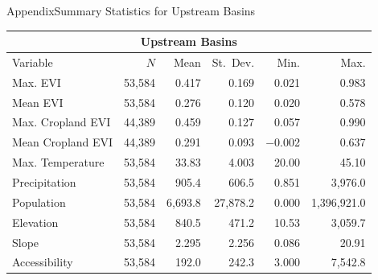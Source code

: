 \documentclass[aspectratio=169,11pt,dvipsnames, handout]{beamer}
\begin{document}

\begin{frame}{\textcolor{defaultclr!30}{Appendix}\hspace{0.75em}Summary Statistics for Upstream Basins}
\label{frame:covars_balance}
    \centering
\begin{tabular}{@{\extracolsep{5pt}}lrrrrr} 
\toprule \multicolumn{6}{c}{Upstream Basins} \\ \midrule
Variable & $N$ & Mean & St.~Dev. & Min. & Max. \\ \midrule
Max. EVI & 53,584 & 0.417 & 0.169 & 0.021 & 0.983 \\ 
Mean EVI & 53,584 & 0.276 & 0.120 & 0.020 & 0.578 \\ 
Max. Cropland EVI & 44,389 & 0.459 & 0.127 & 0.057 & 0.990 \\ 
Mean Cropland EVI & 44,389 & 0.291 & 0.093 & $-$0.002 & 0.637 \\ 
Max. Temperature & 53,584 & 33.83 & 4.003 & 20.00 & 45.10 \\ 
Precipitation & 53,584 & 905.4 & 606.5 & 0.851 & 3,976.0 \\ 
Population & 53,584 & 6,693.8 & 27,878.2 & 0.000 & 1,396,921.0 \\ 
Elevation & 53,584 & 840.5 & 471.2 & 10.53 & 3,059.7 \\ 
Slope & 53,584 & 2.295 & 2.256 & 0.086 & 20.91 \\ 
Accessibility & 53,584 & 192.0 & 242.3 & 3.000 & 7,542.8 \\ \bottomrule
\end{tabular} 

\vspace{0.5em}

\hyperlink{frame:covars}{} 
\hyperlink{frame:sumstats}{}
\end{frame}

\end{document}
